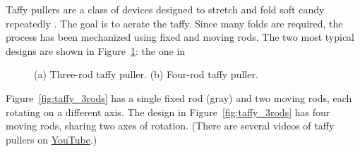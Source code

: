 \documentclass[12pt]{article}
\begin{document}
Taffy pullers are a class of devices designed to stretch and fold soft candy
repeatedly \citep{MattFinn2011_silver,Thiffeault2018}.  The goal is to aerate
the taffy.  Since many folds are required, the process has been mechanized
using fixed and moving rods.  The two most typical designs are shown in
Figure~\ref{fig:taffy}: the one in
%
\begin{figure}
\begin{center}
\hspace{1em}
\end{center}
\caption{(a) Three-rod taffy puller.  (b) Four-rod taffy puller.}
\label{fig:taffy}
\end{figure}
%
Figure~\ref{fig:taffy_3rods} has a single fixed rod (gray) and two moving
rods, each rotating on a different axis.  The design in
Figure~\ref{fig:taffy_3rods} has four moving rods, sharing two axes of
rotation.  (There are several videos of taffy pullers on
\href{https://www.youtube.com/watch?v=6QkGp2qBbn4}{YouTube}.)
\end{document}
